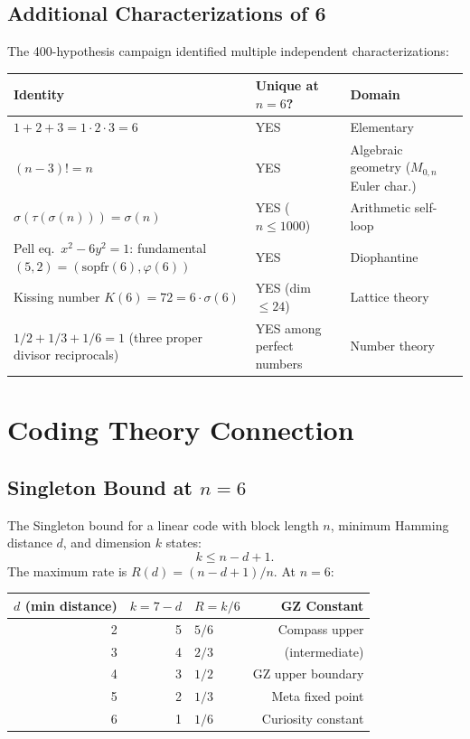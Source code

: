 \documentclass[11pt,a4paper]{article}
\begin{document}
\subsection{Additional Characterizations of 6}

The 400-hypothesis campaign identified multiple independent characterizations:

\begin{center}
\begin{tabular}{lll}
\toprule
Identity & Unique at $n = 6$? & Domain \\
\midrule
$1 + 2 + 3 = 1 \cdot 2 \cdot 3 = 6$ & YES & Elementary \\
$(n-3)! = n$ & YES & Algebraic geometry ($M_{0,n}$ Euler char.) \\
$\sigma(\tau(\sigma(n))) = \sigma(n)$ & YES ($n \leq 1000$) & Arithmetic self-loop \\
Pell eq.\ $x^2 - 6y^2 = 1$: fundamental $(5,2) = (\mathrm{sopfr}(6), \varphi(6))$ & YES & Diophantine \\
Kissing number $K(6) = 72 = 6 \cdot \sigma(6)$ & YES (dim $\leq 24$) & Lattice theory \\
$1/2 + 1/3 + 1/6 = 1$ (three proper divisor reciprocals) & YES among perfect numbers & Number theory \\
\bottomrule
\end{tabular}
\end{center}

\section{Coding Theory Connection}

\subsection{Singleton Bound at $n = 6$}

The Singleton bound for a linear code with block length $n$, minimum Hamming distance $d$, and dimension $k$ states:
\[
k \leq n - d + 1.
\]
The maximum rate is $R(d) = (n - d + 1) / n$. At $n = 6$:

\begin{center}
\begin{tabular}{rrlr}
\toprule
$d$ (min distance) & $k = 7 - d$ & $R = k/6$ & GZ Constant \\
\midrule
2 & 5 & $5/6$ & Compass upper \\
3 & 4 & $2/3$ & (intermediate) \\
4 & 3 & $1/2$ & GZ upper boundary \\
5 & 2 & $1/3$ & Meta fixed point \\
6 & 1 & $1/6$ & Curiosity constant \\
\bottomrule
\end{tabular}
\end{center}
\end{document}
